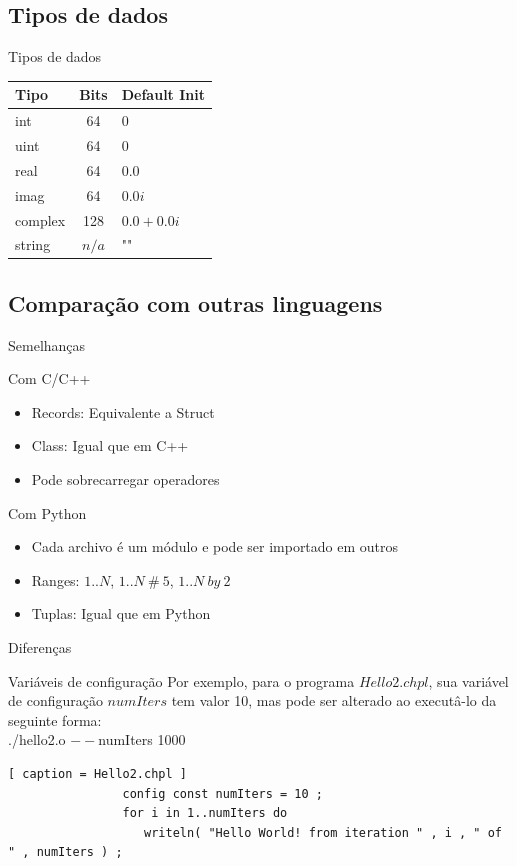 	\subsection{Tipos de dados}
		\begin{frame}
			\begin{block}{Tipos de dados\cite{ChapelQuick}}
			\centering
			\begin{tabular}{ | l | c | l | }
				\hline
				Tipo & Bits & Default Init \\ \hline
				int & 64 & $0$ \\ \hline
				uint & 64 & $0$ \\ \hline
				real & 64 & $0.0$ \\ \hline
				imag & 64 & $0.0i$ \\ \hline
				complex & 128 & $0.0 + 0.0i$ \\ \hline
				string & $n/a$ & "" \\ \hline
			\end{tabular}
			\end{block}
		\end{frame}

	\subsection{Comparação com outras linguagens}
		\begin{frame}{Semelhanças}
			\begin{block}{Com C/C++}
				\begin{itemize}
					\item Records: Equivalente a Struct
					\item Class: Igual que em C++
					\item Pode sobrecarregar operadores
				\end{itemize}
			\end{block}
			\begin{block}{Com Python}
				\begin{itemize}
					\item Cada archivo é um módulo e pode ser importado em outros
					\item Ranges: $1..N$, $1..N\ \#\ 5$, $1..N\ by\ 2$
					\item Tuplas: Igual que em Python
				\end{itemize}
			\end{block}
		\end{frame}
		\begin{frame}[fragile]{Diferenças}
			\begin{block}{Variáveis de configuração}
				Por exemplo, para o programa $Hello2.chpl$, sua variável de configuração $numIters$ tem valor 10, mas pode ser alterado ao executâ-lo da seguinte forma:\\
				\centering
				./hello2.o $--$numIters 1000
			\end{block}
			\begin{lstlisting}[ caption = Hello2.chpl ]
				config const numIters = 10 ;
				for i in 1..numIters do
				   writeln( "Hello World! from iteration " , i , " of " , numIters ) ;
			\end{lstlisting}
		\end{frame}
		
